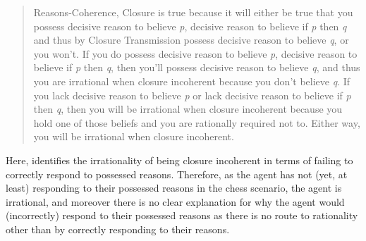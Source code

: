 \documentclass[10pt]{article}
\begin{document}
\begin{quote}
  Reasons-Coherence, Closure is true because it will either be true that you possess decisive reason to believe \emph{p}, decisive reason to believe if \emph{p} then \emph{q} and thus by Closure Transmission possess decisive reason to believe \emph{q}, or you won't.
  If you do possess decisive reason to believe \emph{p}, decisive reason to believe if \emph{p} then \emph{q}, then you'll possess decisive reason to believe \emph{q}, and thus you are irrational when closure incoherent because you don't believe \emph{q}.
  If you lack decisive reason to believe \emph{p} or lack decisive reason to believe if \emph{p} then \emph{q}, then you will be irrational when closure incoherent because you hold one of those beliefs and you are rationally required not to.
  Either way, you will be irrational when closure incoherent.
\end{quote}

Here, \citeauthor{Lord:2018aa} identifies the irrationality of being closure incoherent in terms of failing to correctly respond to possessed reasons.
Therefore, as the agent has not (yet, at least) responding to their possessed reasons in the chess scenario, the agent is irrational, and moreover there is no clear explanation for why the agent would (incorrectly) respond to their possessed reasons as there is no route to rationality other than by correctly responding to their reasons.




\newpage

\printbibliography
\end{document}
